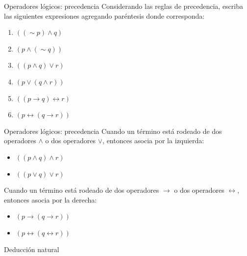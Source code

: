 \documentclass{beamer}
\begin{document}
\begin{frame}{Operadores lógicos: precedencia}
  Considerando las reglas de precedencia, escriba las siguientes expresiones
  agregando paréntesis donde corresponda:
  \begin{enumerate}
    \item{ $((\sim p) \land q)$}
    \item{ $(p \land (\sim q))$}
    \item{ $((p \land q) \vee r)$}
    \item{ $(p \vee (q \land r))$}
    \item{
          $((p \rightarrow q) \leftrightarrow r)$}
    \item{
          $(p \leftrightarrow (q \rightarrow r))$}
  \end{enumerate}
\end{frame}


\begin{frame}{Operadores lógicos: precedencia}
  Cuando un término está rodeado de dos operadores $\land$ o dos operadores
  $\vee$, entonces asocia por la izquierda:
  \begin{itemize}
    \item{ $((p \land q) \land r)$}
    \item{ $((p \vee q) \vee r)$}
  \end{itemize}


  Cuando un término está rodeado de dos operadores $\rightarrow$ o dos
  operadores $\leftrightarrow$, entonces asocia por la derecha:
  \begin{itemize}
    \item{
          $(p \rightarrow (q \rightarrow r))$}
    \item{
          $(p \leftrightarrow (q \leftrightarrow r))$}
  \end{itemize}
\end{frame}


\begin{frame}[plain,c]
  \vspace{1cm}
  \begin{center}
    \Huge Deducción natural
  \end{center}
\end{frame}
\end{document}
